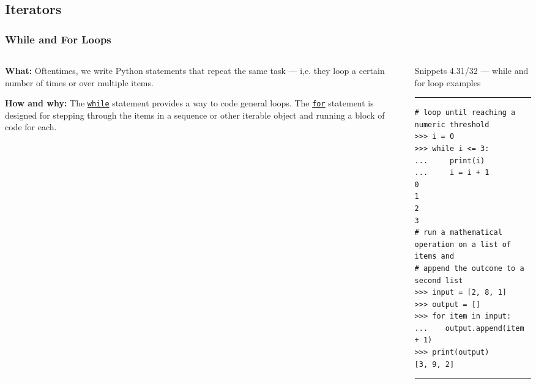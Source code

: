 \documentclass[aspectratio=1610]{beamer}
\begin{document}
\subsection{Iterators }

\begin{frame}[fragile]
    \frametitle{While and For Loops}
        \begin{columns}
            \begin{column}{0.35\textwidth}
            \quad \textbf{What:} 
            Oftentimes, we write Python statements that repeat the same task --- i,e. they loop a certain number of times or over multiple items.

            \vspace{1em}
        
            \quad \textbf{How and why:}
            The \href{https://docs.python.org/3/reference/compound_stmts.html\#while}{\texttt{while}} statement provides a way to code general loops. The \href{https://docs.python.org/3/reference/compound_stmts.html\#for}{\texttt{for}} statement is designed for stepping through the items in a sequence or other iterable object and running a block of code for each.
            \end{column}
            \begin{column}{0.55\textwidth}
            Snippets 4.31/32 --- while and for loop examples
            \rule{\textwidth}{1pt}
                \scriptsize
                \begin{verbatim} 
# loop until reaching a numeric threshold
>>> i = 0
>>> while i <= 3:
...     print(i)
...     i = i + 1
0
1
2
3
# run a mathematical operation on a list of items and 
# append the outcome to a second list 
>>> input = [2, 8, 1]
>>> output = []
>>> for item in input:
...    output.append(item + 1)
>>> print(output)
[3, 9, 2]
               \end{verbatim}
           \rule{\textwidth}{1pt}
           \end{column}
    \end{columns}
\end{frame}
\end{document}
